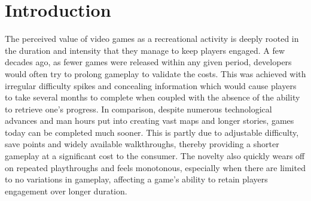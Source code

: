 \documentclass{Configuration_Files/PoliMi3i_thesis}
\begin{document}

\thispagestyle{empty}
\tableofcontents %
\thispagestyle{empty}
\cleardoublepage

%
%
%    
%

\mainmatter %

\chapter{Introduction}
\label{ch:introduction}%

The perceived value of video games as a recreational activity is deeply rooted in the 
duration and intensity that they manage to keep players engaged. A few decades 
ago, as fewer games were released within any given period, developers would often 
try to prolong gameplay to validate the costs. This was achieved with irregular 
difficulty spikes and concealing information which would cause players to take several 
months to complete when coupled with the absence of the ability to retrieve 
one’s progress. In comparison, despite numerous technological advances and man hours 
put into creating vast maps and longer stories, games today can be completed much 
sooner. This is partly due to adjustable difficulty, save points and widely available 
walkthroughs, thereby providing a shorter gameplay at a significant cost to the consumer. 
The novelty also quickly wears off on repeated playthroughs and feels monotonous, 
especially when there are limited to no variations in gameplay, affecting a game’s 
ability to retain players engagement over longer duration.
\end{document}
